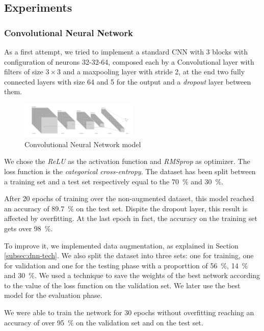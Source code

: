 \documentclass{article}
\begin{document}
\subsection{Experiments}
\label{subsec:dnn-experiments}

\subsubsection{Convolutional Neural Network}
As a first attempt, we tried to implement a standard CNN with 3 blocks with configuration of neurons 32-32-64, composed each by a Convolutional layer with filters of size $3\times 3$ and a maxpooling layer with stride 2, at the end two fully connected layers with size 64 and 5 for the output and a \emph{dropout} layer between them.
\begin{figure}[h]
    \centering
    \includegraphics[width=0.5\textwidth]{img/cnn_figure.PNG}
    \caption{Convolutional Neural Network model}
    \label{fig:CNN model}
\end{figure}

We chose the \emph{ReLU} as the activation function and \emph{RMSprop} as optimizer. The loss function is the \emph{categorical cross-entropy}. The dataset has been split between a training set and a test set respectively equal to the \SI{70}{\percent} and \SI{30}{\percent}.

After 20 epochs of training over the non-augmented dataset, this model reached an accuracy of \SI{89.7}{\percent} on the test set.
Dispite the dropout layer, this result is affected by overfitting. At the last epoch in fact, the accuracy on the training set gets over \SI{98}{\percent}.

To improve it, we implemented data augmentation, as explained in Section \ref{subsec:dnn-tech}. We also split the dataset into three sets: one for training, one for validation and one for the testing phase with a proporttion of \SI{56}{\percent}, \SI{14}{\percent}  and \SI{30}{\percent}. We used a technique to save the weights of the best network according to the value of the loss function on the validation set. We later use the best model for the evaluation phase.

We were able to train the network for 30 epochs without overfitting reaching an accuracy of over \SI{95}{\percent} on the validation set and  on the test set.
\end{document}
